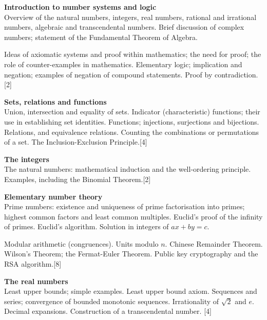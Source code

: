 \documentclass[a4paper]{article}
\begin{document}
\maketitle
{
  \small
  \noindent\textbf{Introduction to number systems and logic}\\
  Overview of the natural numbers, integers, real numbers, rational and irrational numbers, algebraic and transcendental numbers. Brief discussion of complex numbers; statement of the Fundamental Theorem of Algebra.

  \vspace{5pt}
  \noindent Ideas of axiomatic systems and proof within mathematics; the need for proof; the role of counter-examples in mathematics. Elementary logic; implication and negation; examples of negation of compound statements. Proof by contradiction.\hspace*{\fill}[2]

  \vspace{10pt}
  \noindent\textbf{Sets, relations and functions}\\
  Union, intersection and equality of sets. Indicator (characteristic) functions; their use in establishing set identities. Functions; injections, surjections and bijections. Relations, and equivalence relations. Counting the combinations or permutations of a set. The Inclusion-Exclusion Principle.\hspace*{\fill}[4]

  \vspace{10pt}
  \noindent\textbf{The integers}\\
  The natural numbers: mathematical induction and the well-ordering principle. Examples, including the Binomial Theorem.\hspace*{\fill}[2]

  \vspace{10pt}
  \noindent\textbf{Elementary number theory}\\
  Prime numbers: existence and uniqueness of prime factorisation into primes; highest common factors and least common multiples. Euclid's proof of the infinity of primes. Euclid's algorithm. Solution in integers of $ax+by = c$.

  \vspace{5pt}
  \noindent Modular arithmetic (congruences). Units modulo $n$. Chinese Remainder Theorem. Wilson's Theorem; the Fermat-Euler Theorem. Public key cryptography and the RSA algorithm.\hspace*{\fill}[8]

  \vspace{10pt}
  \noindent\textbf{The real numbers}\\
  Least upper bounds; simple examples. Least upper bound axiom. Sequences and series; convergence of bounded monotonic sequences. Irrationality of $\sqrt{2}$ and $e$. Decimal expansions. Construction of a transcendental number.\hspace*{\fill} [4]

}
\end{document}
